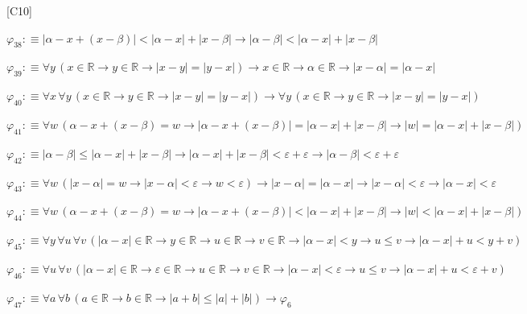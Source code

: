 \begin{fullproof}{[C10]}
\begin{abbrevlist}
\item $\varphi_{38} :\equiv \lvert \alpha - x + (x - \beta) \rvert < \lvert \alpha - x \rvert + \lvert x - \beta \rvert \to \lvert \alpha - \beta \rvert < \lvert \alpha - x \rvert + \lvert x - \beta \rvert$
\item $\varphi_{39} :\equiv \forall y\,(x \in \mathbb{R} \to y \in \mathbb{R} \to \lvert x - y \rvert = \lvert y - x \rvert) \to x \in \mathbb{R} \to \alpha \in \mathbb{R} \to \lvert x - \alpha \rvert = \lvert \alpha - x \rvert$
\item $\varphi_{40} :\equiv \forall x\,\forall y\,(x \in \mathbb{R} \to y \in \mathbb{R} \to \lvert x - y \rvert = \lvert y - x \rvert) \to \forall y\,(x \in \mathbb{R} \to y \in \mathbb{R} \to \lvert x - y \rvert = \lvert y - x \rvert)$
\item $\varphi_{41} :\equiv \forall w\,(\alpha - x + (x - \beta) = w \to \lvert \alpha - x + (x - \beta) \rvert = \lvert \alpha - x \rvert + \lvert x - \beta \rvert \to \lvert w \rvert = \lvert \alpha - x \rvert + \lvert x - \beta \rvert)$
\item $\varphi_{42} :\equiv \lvert \alpha - \beta \rvert \leq \lvert \alpha - x \rvert + \lvert x - \beta \rvert \to \lvert \alpha - x \rvert + \lvert x - \beta \rvert < \varepsilon + \varepsilon \to \lvert \alpha - \beta \rvert < \varepsilon + \varepsilon$
\item $\varphi_{43} :\equiv \forall w\,(\lvert x - \alpha \rvert = w \to \lvert x - \alpha \rvert < \varepsilon \to w < \varepsilon) \to \lvert x - \alpha \rvert = \lvert \alpha - x \rvert \to \lvert x - \alpha \rvert < \varepsilon \to \lvert \alpha - x \rvert < \varepsilon$
\item $\varphi_{44} :\equiv \forall w\,(\alpha - x + (x - \beta) = w \to \lvert \alpha - x + (x - \beta) \rvert < \lvert \alpha - x \rvert + \lvert x - \beta \rvert \to \lvert w \rvert < \lvert \alpha - x \rvert + \lvert x - \beta \rvert)$
\item $\varphi_{45} :\equiv \forall y\,\forall u\,\forall v\,(\lvert \alpha - x \rvert \in \mathbb{R} \to y \in \mathbb{R} \to u \in \mathbb{R} \to v \in \mathbb{R} \to \lvert \alpha - x \rvert < y \to u \leq v \to \lvert \alpha - x \rvert + u < y + v)$
\item $\varphi_{46} :\equiv \forall u\,\forall v\,(\lvert \alpha - x \rvert \in \mathbb{R} \to \varepsilon \in \mathbb{R} \to u \in \mathbb{R} \to v \in \mathbb{R} \to \lvert \alpha - x \rvert < \varepsilon \to u \leq v \to \lvert \alpha - x \rvert + u < \varepsilon + v)$
\item $\varphi_{47} :\equiv \forall a\,\forall b\,(a \in \mathbb{R} \to b \in \mathbb{R} \to \lvert a + b \rvert \leq \lvert a \rvert + \lvert b \rvert) \to \varphi_{6}$

\end{abbrevlist}
\end{fullproof}
